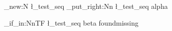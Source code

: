 \ExplSyntaxOn
\seq_new:N \l_test_seq
\seq_put_right:Nn \l_test_seq {alpha}

\seq_if_in:NnTF \l_test_seq {beta} {found}{missing}
\ExplSyntaxOff
